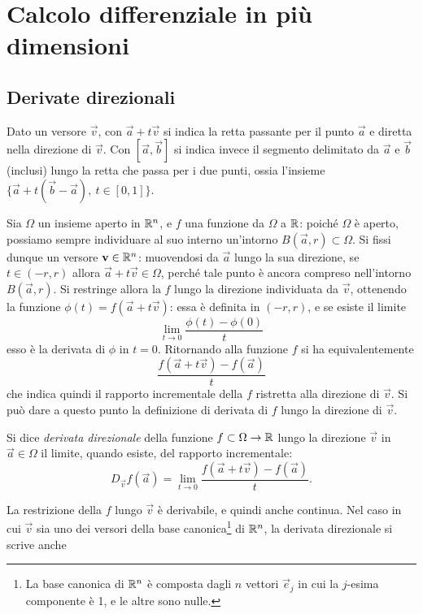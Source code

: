 \chapter[Calcolo differenziale in più dimensioni]{Calcolo differenziale in più\\dimensioni}
\section{Derivate direzionali}
Dato un versore $\vec v$, con $\vec a+t\vec v$ si indica la retta passante per il punto $\vec a$ e diretta nella direzione di $\vec v$. Con $[\vec a,\vec b]$ si indica invece il segmento delimitato da $\vec a$ e $\vec b$ (inclusi) lungo la retta che passa per i due punti, ossia l'insieme $\{\vec a+t(\vec b-\vec a),\ t\in[0,1]\}$.

Sia $\Omega$ un insieme aperto in $\mathbb{R}^n$, e $f$ una funzione da $\Omega$ a $\mathbb{R}$: poiché $\Omega$ è aperto, possiamo sempre individuare al suo interno un'intorno $B(\vec a,r)\subset\Omega$. Si fissi dunque un versore $\mathbf{v}\in\mathbb{R}^n$: muovendosi da $\vec a$ lungo la sua direzione, se $t\in(-r,r)$ allora $\vec a+t\vec v\in\Omega$, perché tale punto è ancora compreso nell'intorno $B(\vec a,r)$. Si restringe allora la $f$ lungo la direzione individuata da $\vec v$, ottenendo la funzione $\phi(t)=f(\vec a+t\vec v)$: essa è definita in $(-r,r)$, e se esiste il limite
\[
\lim_{t\to 0}\frac{\phi(t)-\phi(0)}{t}
\]
esso è la derivata di $\phi$ in $t=0$. Ritornando alla funzione $f$ si ha equivalentemente
\begin{equation} \label{rapporto-incrementale}
\frac{f(\vec a+t\vec v)-f(\vec a)}{t}
\end{equation}
che indica quindi il rapporto incrementale della $f$ ristretta alla direzione di $\vec v$. Si può dare a questo punto la definizione di derivata di $f$ lungo la direzione di $\vec v$.
\begin{definizione} \label{d:derivata-dir}
Si dice \emph{derivata direzionale} della funzione $f\subset\Omega\to\mathbb{R}$ lungo la direzione $\vec v$ in $\vec a\in\Omega$ il limite, quando esiste, del rapporto incrementale:
\[
D_{\vec v}f(\vec a)=\lim_{t\to 0}\frac{f(\vec a+t\vec v)-f(\vec a)}{t}.
\]
\end{definizione}
La restrizione della $f$ lungo $\vec v$ è derivabile, e quindi anche continua. Nel caso in cui $\vec v$ sia uno dei versori della base canonica\footnote{La base canonica di $\mathbb{R}^n$ è composta dagli $n$ vettori $\vec e_j$ in cui la $j$-esima componente è 1, e le altre sono nulle.} di $\mathbb{R}^n$, la derivata direzionale si scrive anche
